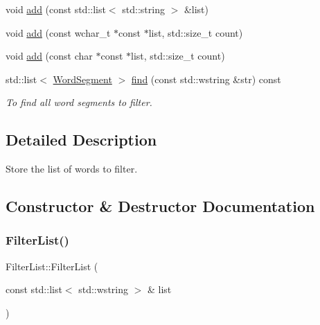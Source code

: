 \begin{DoxyCompactItemize}
void \hyperlink{classlakoo_1_1_filter_list_ae4b7da9839649af588d682d63feb5e97}{add} (const std\+::list$<$ std\+::string $>$ \&list)
\item 
void \hyperlink{classlakoo_1_1_filter_list_abe0dd9734dfbbac5127d5bddfaf014c4}{add} (const wchar\+\_\+t $\ast$const $\ast$list, std\+::size\+\_\+t count)
\item 
void \hyperlink{classlakoo_1_1_filter_list_aedc65b86f12419f9308f669751c5788a}{add} (const char $\ast$const $\ast$list, std\+::size\+\_\+t count)
\item 
std\+::list$<$ \hyperlink{structlakoo_1_1_word_segment}{Word\+Segment} $>$ \hyperlink{classlakoo_1_1_filter_list_a94847c238bf5f7275d858c4942e1ba78}{find} (const std\+::wstring \&str) const
\begin{DoxyCompactList}\small\item\em To find all word segments to filter. \end{DoxyCompactList}\end{DoxyCompactItemize}


\subsection{Detailed Description}
Store the list of words to filter. 

\subsection{Constructor \& Destructor Documentation}
\mbox{\label{classlakoo_1_1_filter_list_a664a64a5eab384a18d454348314ec9e8}} 
\subsubsection{\texorpdfstring{Filter\+List()}{FilterList()}\hspace{0.1cm}{\footnotesize\ttfamily [1/4]}}
{\footnotesize\ttfamily Filter\+List\+::\+Filter\+List (\begin{DoxyParamCaption}\item[{const std\+::list$<$ std\+::wstring $>$ \&}]{list }\end{DoxyParamCaption})\hspace{0.3cm}{\ttfamily [explicit]}}




